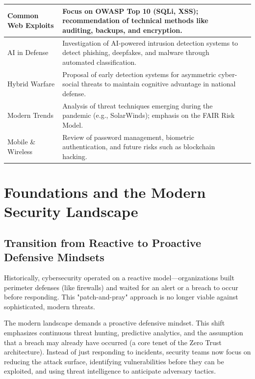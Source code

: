 \documentclass[11pt,a4paper]{article}
\begin{document}
{\begin{longtable}{|p{3.5cm}|p{10cm}|p{1.5cm}|}
    {\fontsize{11}{13}\selectfont Common Web Exploits} & {\fontsize{11}{13}\selectfont Focus on OWASP Top 10 (SQLi, XSS); recommendation of technical methods like auditing, backups, and encryption.} & \cite{b5} \\ \hline

    {\fontsize{11}{13}\selectfont AI in Defense} & {\fontsize{11}{13}\selectfont Investigation of AI-powered intrusion detection systems to detect phishing, deepfakes, and malware through automated classification.} & \cite{b6} \\ \hline

    {\fontsize{11}{13}\selectfont Hybrid Warfare} & {\fontsize{11}{13}\selectfont Proposal of early detection systems for asymmetric cyber-social threats to maintain cognitive advantage in national defense.} & \cite{b7} \\ \hline

    {\fontsize{11}{13}\selectfont Modern Trends} & {\fontsize{11}{13}\selectfont Analysis of threat techniques emerging during the pandemic (e.g., SolarWinds); emphasis on the FAIR Risk Model.} & \cite{b9} \\ \hline

    {\fontsize{11}{13}\selectfont Mobile \& Wireless} & {\fontsize{11}{13}\selectfont Review of password management, biometric authentication, and future risks such as blockchain hacking.} & \cite{b10} \\ \hline

\end{longtable}
}

\section{Foundations and the Modern Security Landscape}
\subsection{Transition from Reactive to Proactive Defensive Mindsets}
Historically, cybersecurity operated on a reactive model—organizations built perimeter defenses (like firewalls) and waited for an alert or a breach to occur before responding. This "patch-and-pray" approach is no longer viable against sophisticated, modern threats.
\vspace{1em}

The modern landscape demands a proactive defensive mindset. This shift emphasizes continuous threat hunting, predictive analytics, and the assumption that a breach may already have occurred (a core tenet of the Zero Trust architecture). Instead of just responding to incidents, security teams now focus on reducing the attack surface, identifying vulnerabilities before they can be exploited, and using threat intelligence to anticipate adversary tactics.
\end{document}
